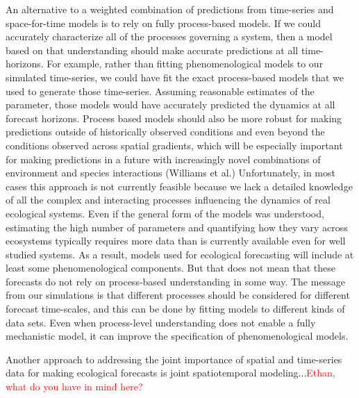 \documentclass[11pt]{article}
\newcommand{\comment}{\textcolor{red}}
\begin{document}
An alternative to a weighted combination of predictions from time-series and space-for-time models is to rely on fully process-based models.
If we could accurately characterize all of the processes governing a system, then a model based on that understanding should make accurate
predictions at all time-horizons. For example, rather than fitting phenomenological models to our simulated time-series, we could have fit the exact process-based models that we used to generate those time-series. Assuming reasonable estimates of the parameter, those models would have accurately predicted the dynamics at all forecast horizons. Process based models should also be more robust for making predictions outside of historically observed conditions and even beyond the conditions observed across spatial gradients, which will be especially important for making predictions in a future with increasingly novel combinations of environment and species interactions (Williams et al.) Unfortunately, in most cases this approach is not currently feasible because we lack a detailed knowledge of all the complex and interacting processes influencing the dynamics of real ecological systems. Even if the general form of the models was understood, estimating the high number of parameters and quantifying how they vary across ecosystems typically requires more data than is currently available even for well studied systems. As a result, models used for ecological forecasting will include at least some phenomenological components. But that does not mean that these forecasts do not rely on process-based understanding in some way. The message from our simulations is that different processes should be considered for different forecast time-scales, and this can be done by fitting models to different kinds of data sets. Even when process-level understanding does not enable a fully mechanistic model, it can improve the specification of phenomenological models.

Another approach to addressing the joint importance of spatial and time-series data for making ecological forecasts is joint spatiotemporal modeling...\comment{Ethan, what do you have in mind here?}
\end{document}
